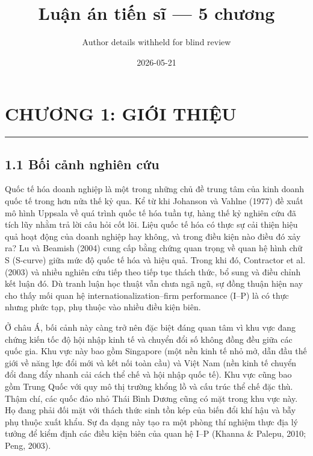 \documentclass[12pt,a4paper]{article}
\title{Luận án tiến sĩ --- 5 chương}
\author{Author details withheld for blind review}
\date{2026-05-21}
\begin{document}
\maketitle

\hypertarget{chux1b0ux1a1ng-1-giux1edbi-thiux1ec7u}{%
\section{CHƯƠNG 1: GIỚI
THIỆU}\label{chux1b0ux1a1ng-1-giux1edbi-thiux1ec7u}}

\begin{center}\rule{0.5\linewidth}{0.5pt}\end{center}

\hypertarget{11-bux1ed1i-cux1ea3nh-nghiuxean-cux1ee9u}{%
\subsection{1.1 Bối cảnh nghiên
cứu}\label{11-bux1ed1i-cux1ea3nh-nghiuxean-cux1ee9u}}

Quốc tế hóa doanh nghiệp là một trong những chủ đề trung tâm của kinh
doanh quốc tế trong hơn nửa thế kỷ qua. Kể từ khi Johanson và Vahlne
(1977) đề xuất mô hình Uppsala về quá trình quốc tế hóa tuần tự, hàng
thế kỷ nghiên cứu đã tích lũy nhằm trả lời câu hỏi cốt lõi. Liệu quốc tế
hóa có thực sự cải thiện hiệu quả hoạt động của doanh nghiệp hay không,
và trong điều kiện nào điều đó xảy ra? Lu và Beamish (2004) cung cấp
bằng chứng quan trọng về quan hệ hình chữ S (S-curve) giữa mức độ quốc
tế hóa và hiệu quả. Trong khi đó, Contractor et al. (2003) và nhiều
nghiên cứu tiếp theo tiếp tục thách thức, bổ sung và điều chỉnh kết luận
đó. Dù tranh luận học thuật vẫn chưa ngã ngũ, sự đồng thuận hiện nay cho
thấy mối quan hệ internationalization--firm performance (I--P) là có
thực nhưng phức tạp, phụ thuộc vào nhiều điều kiện biên.

Ở châu Á, bối cảnh này càng trở nên đặc biệt đáng quan tâm vì khu vực
đang chứng kiến tốc độ hội nhập kinh tế và chuyển đổi số không đồng đều
giữa các quốc gia. Khu vực này bao gồm Singapore (một nền kinh tế nhỏ
mở, dẫn đầu thế giới về năng lực đổi mới và kết nối toàn cầu) và Việt
Nam (nền kinh tế chuyển đổi đang đẩy nhanh cải cách thể chế và hội nhập
quốc tế). Khu vực cũng bao gồm Trung Quốc với quy mô thị trường khổng lồ
và cấu trúc thể chế đặc thù. Thậm chí, các quốc đảo nhỏ Thái Bình Dương
cũng có mặt trong khu vực này. Họ đang phải đối mặt với thách thức sinh
tồn kép của biến đổi khí hậu và bẫy phụ thuộc xuất khẩu. Sự đa dạng này
tạo ra một phòng thí nghiệm thực địa lý tưởng để kiểm định các điều kiện
biên của quan hệ I--P (Khanna \& Palepu, 2010; Peng, 2003).
\end{document}
